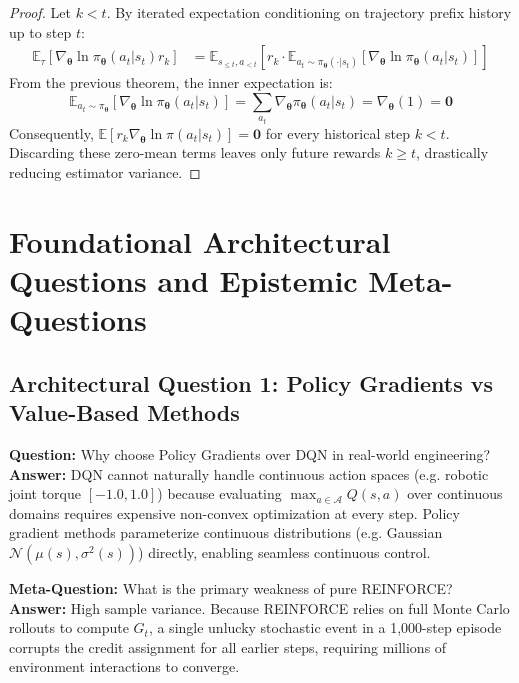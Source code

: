 \documentclass[11pt,a4paper]{article}
\theoremstyle{definition}
\begin{document}
\begin{proof}
Let $k < t$. By iterated expectation conditioning on trajectory prefix history up to step $t$:
{\boldmath
\begin{align}
\mathbb{E}_{\tau} \left[ \nabla_{\boldsymbol{\theta}} \ln \pi_{\boldsymbol{\theta}}(a_t | s_t) r_k \right] &= \mathbb{E}_{s_{\le t}, a_{< t}} \left[ r_k \cdot \mathbb{E}_{a_t \sim \pi_{\boldsymbol{\theta}}(\cdot | s_t)} \left[ \nabla_{\boldsymbol{\theta}} \ln \pi_{\boldsymbol{\theta}}(a_t | s_t) \right] \right]
\end{align}
}
From the previous theorem, the inner expectation is:
{\boldmath
\begin{equation}
\mathbb{E}_{a_t \sim \pi_{\boldsymbol{\theta}}} \left[ \nabla_{\boldsymbol{\theta}} \ln \pi_{\boldsymbol{\theta}}(a_t | s_t) \right] = \sum_{a_t} \nabla_{\boldsymbol{\theta}} \pi_{\boldsymbol{\theta}}(a_t | s_t) = \nabla_{\boldsymbol{\theta}}(1) = \mathbf{0}
\end{equation}
}
Consequently, $\mathbb{E}[r_k \nabla_{\boldsymbol{\theta}} \ln \pi(a_t | s_t)] = \mathbf{0}$ for every historical step $k < t$.
Discarding these zero-mean terms leaves only future rewards $k \ge t$, drastically reducing estimator variance.
\end{proof}

\section{Foundational Architectural Questions and Epistemic Meta-Questions}

\subsection{Architectural Question 1: Policy Gradients vs Value-Based Methods}
\textbf{Question:} Why choose Policy Gradients over DQN in real-world engineering?\\
\textbf{Answer:} DQN cannot naturally handle continuous action spaces (e.g. robotic joint torque $[-1.0, 1.0]$) because evaluating $\max_{a \in \mathcal{A}} Q(s, a)$ over continuous domains requires expensive non-convex optimization at every step. Policy gradient methods parameterize continuous distributions (e.g. Gaussian $\mathcal{N}(\mu(s), \sigma^2(s))$) directly, enabling seamless continuous control.

\textbf{Meta-Question:} What is the primary weakness of pure REINFORCE?\\
\textbf{Answer:} High sample variance. Because REINFORCE relies on full Monte Carlo rollouts to compute $G_t$, a single unlucky stochastic event in a 1,000-step episode corrupts the credit assignment for all earlier steps, requiring millions of environment interactions to converge.
\end{document}
